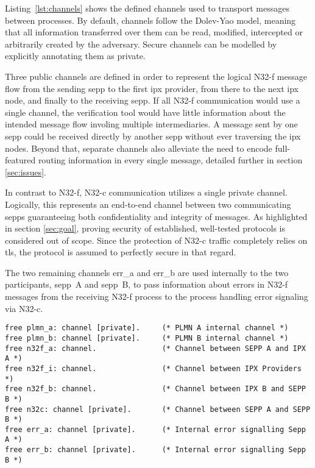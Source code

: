 Listing~\ref{lst:channels} shows the defined channels used to transport messages between processes.
By default, channels follow the Dolev-Yao model, meaning that all information transferred over them can be read, modified, intercepted or arbitrarily created by the adversary.
Secure channels can be modelled by explicitly annotating them as private.

Three public channels are defined in order to represent the logical N32-f message flow from the sending \gls{sepp} to the first \gls{ipx} provider, from there to the next \gls{ipx} node, and finally to the receiving \gls{sepp}.
If all N32-f communication would use a single channel, the verification tool would have little information about the intended message flow involing multiple intermediaries.
A message sent by one \gls{sepp} could be received directly by another \gls{sepp} without ever traversing the \gls{ipx} nodes.
Beyond that, separate channels also alleviate the need to encode full-featured routing information in every single message, detailed further in section \ref{sec:issues}.

In contrast to N32-f, N32-c communication utilizes a single private channel.
Logically, this represents an end-to-end channel between two communicating \glspl{sepp} guaranteeing both confidentiality and integrity of messages.
As highlighted in section \ref{sec:goal}, proving security of established, well-tested protocols is considered out of scope.
Since the protection of N32-c traffic completely relies on \gls{tls}, the protocol is assumed to perfectly secure in that regard.

The two remaining channels {\sffamily err\_a} and {\sffamily err\_b} are used internally to the two participants, \gls{sepp}~A and \gls{sepp}~B, to pass information about errors in N32-f messages from the receiving N32-f process to the process handling error signaling via N32-c.

\begin{lstlisting}[caption={Custom channel declarations},label={lst:channels},firstnumber=15]
free plmn_a: channel [private].     (* PLMN A internal channel *)
free plmn_b: channel [private].     (* PLMN B internal channel *)
free n32f_a: channel.               (* Channel between SEPP A and IPX A *)
free n32f_i: channel.               (* Channel between IPX Providers *)
free n32f_b: channel.               (* Channel between IPX B and SEPP B *)
free n32c: channel [private].       (* Channel between SEPP A and SEPP B *)
free err_a: channel [private].      (* Internal error signalling Sepp A *)
free err_b: channel [private].      (* Internal error signalling Sepp B *)
\end{lstlisting}

